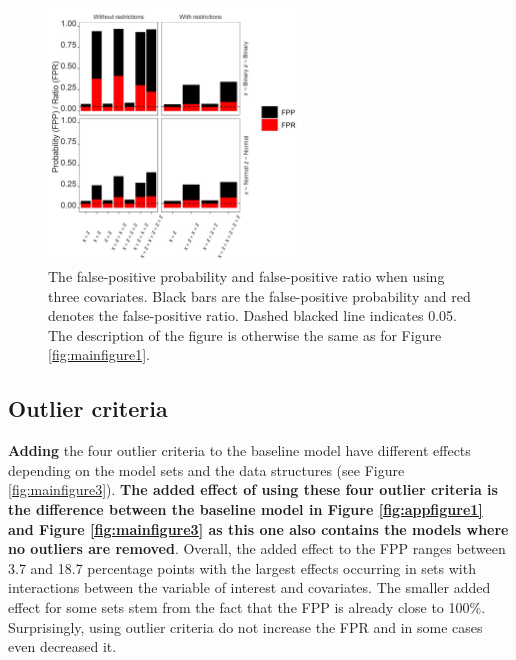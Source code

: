 \begin{figure}[hbt!]
\includegraphics[width=0.6\textwidth]{R/Analysis/Result/Figures/Figure1C.jpeg}
\centering
\caption{The false-positive probability and false-positive ratio when using three covariates. Black bars are the false-positive probability and red denotes the false-positive ratio. Dashed blacked line indicates 0.05. The description of the figure is otherwise the same as for Figure \ref{fig:mainfigure1}.}
\label{fig:mainfigure2}
\end{figure}

\subsection{Outlier criteria}
\textbf{Adding} the four outlier criteria to the baseline model have different effects depending on the model sets and the data structures (see Figure \ref{fig:mainfigure3}). \textbf{The added effect of using these four outlier criteria is the difference between the baseline model in Figure \ref{fig:appfigure1} and Figure \ref{fig:mainfigure3} as this one also contains the models where no outliers are removed}. Overall, the added effect to the FPP ranges between 3.7 and 18.7 percentage points with the largest effects occurring in sets with interactions between the variable of interest and covariates. The smaller added effect for some sets stem from the fact that the FPP is already close to 100\%. Surprisingly, using outlier criteria do not increase the FPR and in some cases even decreased it. 

